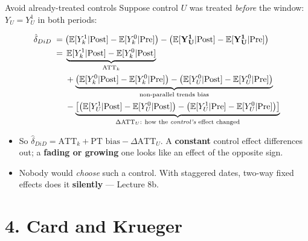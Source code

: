 \documentclass[
  11pt,
  ignorenonframetext,
  aspectratio=169,
]{beamer}
\providecommand{\tightlist}{%
  \setlength{\itemsep}{0pt}\setlength{\parskip}{0pt}}
\begin{document}
\begin{frame}{Avoid already-treated controls}
\protect{}\label{avoid-already-treated-controls}
Suppose control \(U\) was treated \emph{before} the window:
\(Y_U = Y^1_U\) in both periods:

\vspace{-0.5em}\small

\begin{align*}
\hat\delta_{DiD} \;=\;& \big(\mathbb{E}[Y^{1}_k|\text{Post}] - \mathbb{E}[Y^{0}_k|\text{Pre}]\big) - \big(\mathbb{E}[\mathbf{Y^{1}_U}|\text{Post}] - \mathbb{E}[\mathbf{Y^{1}_U}|\text{Pre}]\big) \\
=\;& \underbrace{\mathbb{E}[Y^1_k|\text{Post}] - \mathbb{E}[Y^0_k|\text{Post}]}_{\text{ATT}_k} \\
&+ \underbrace{\big(\mathbb{E}[Y^0_k|\text{Post}] - \mathbb{E}[Y^0_k|\text{Pre}]\big) - \big(\mathbb{E}[Y^0_U|\text{Post}] - \mathbb{E}[Y^0_U|\text{Pre}]\big)}_{\text{non-parallel trends bias}} \\
&- \underbrace{\big[\big(\mathbb{E}[Y^1_U|\text{Post}] - \mathbb{E}[Y^0_U|\text{Post}]\big) - \big(\mathbb{E}[Y^1_U|\text{Pre}] - \mathbb{E}[Y^0_U|\text{Pre}]\big)\big]}_{\Delta\text{ATT}_U:\ \text{how the \emph{control's} effect changed}}
\end{align*} \normalsize\vspace{-0.6em}

\begin{itemize}
\tightlist
\item
  So
  \(\hat\delta_{DiD} = \text{ATT}_k + \text{PT bias} - \Delta\text{ATT}_U\).
  A \textbf{constant} control effect differences out; a \textbf{fading
  or growing} one looks like an effect of the opposite sign.
\item
  Nobody would \emph{choose} such a control. With staggered dates,
  two-way fixed effects does it \textbf{silently} --- Lecture 8b.
\end{itemize}
\end{frame}

\section{4. Card and Krueger}\label{card-and-krueger}
\end{document}
